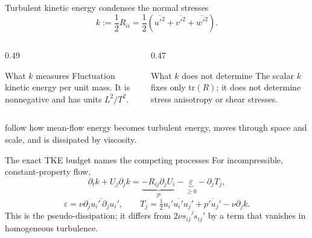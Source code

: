 \documentclass[aspectratio=169,11pt]{beamer}
\newcommand{\mean}[1]{\overline{#1}}
\begin{document}
\begin{frame}{Turbulent kinetic energy condenses the normal stresses}
\[
  k:=\frac12R_{ii}
  =\frac12\left(\mean{u'^2}+\mean{v'^2}+\mean{w'^2}\right).
\]

\begin{columns}[T,onlytextwidth]
\begin{column}{0.49\textwidth}
\begin{block}{What $k$ measures}
Fluctuation kinetic energy per unit mass. It is nonnegative and has units $L^2/T^2$.
\end{block}
\end{column}
\begin{column}{0.47\textwidth}
\begin{block}{What $k$ does not determine}
The scalar $k$ fixes only $\mathrm{tr}(R)$; it does not determine stress anisotropy or shear stresses.
\end{block}
\end{column}
\end{columns}

\vspace{0.5em}
 follow how mean-flow energy becomes turbulent energy, moves through space and scale, and is dissipated by viscosity.
\end{frame}

\begin{frame}{The exact TKE budget names the competing processes}
For incompressible, constant-property flow,
\[
  \partial_tk+U_j\partial_jk
  =\underbrace{-R_{ij}\partial_jU_i}_{\mathcal P}
   -\underbrace{\varepsilon}_{\ge 0}
   -\partial_jT_j,
\]
\[
  \varepsilon=\nu\mean{\partial_ju_i'\,\partial_ju_i'},
  \qquad
  T_j=\tfrac12\mean{u_i'u_i'u_j'}+\mean{p'u_j'}-\nu\partial_jk.
\]
{\small This is the pseudo-dissipation; it differs from $2\nu\mean{s_{ij}'s_{ij}'}$ by a term that vanishes in homogeneous turbulence.}

\centering
{}
\end{frame}
\end{document}
